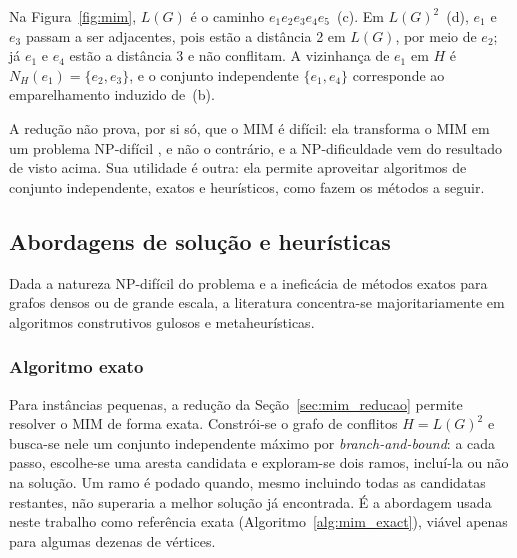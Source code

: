 Na Figura~\ref{fig:mim}, $L(G)$ é o caminho $e_1 e_2 e_3 e_4 e_5$~(c). Em $L(G)^2$~(d), $e_1$ e $e_3$ passam a ser adjacentes, pois estão a distância 2 em $L(G)$, por meio de $e_2$; já $e_1$ e $e_4$ estão a distância 3 e não conflitam. A vizinhança de $e_1$ em $H$ é $N_H(e_1) = \{e_2, e_3\}$, e o conjunto independente $\{e_1, e_4\}$ corresponde ao emparelhamento induzido de~(b).

A redução não prova, por si só, que o MIM é difícil: ela transforma o MIM em um problema NP-difícil \cite{garey-jhonson}, e não o contrário, e a NP-dificuldade vem do resultado de  visto acima. Sua utilidade é outra: ela permite aproveitar algoritmos de conjunto independente, exatos e heurísticos, como fazem os métodos a seguir.

\subsection{Abordagens de solução e heurísticas}

Dada a natureza NP-difícil do problema e a ineficácia de métodos exatos para grafos densos ou de grande escala, a literatura concentra-se majoritariamente em algoritmos construtivos gulosos e metaheurísticas.

\subsubsection{Algoritmo exato}

Para instâncias pequenas, a redução da Seção~\ref{sec:mim_reducao} permite resolver o MIM de forma exata. Constrói-se o grafo de conflitos $H = L(G)^2$ e busca-se nele um conjunto independente máximo por \textit{branch-and-bound}: a cada passo, escolhe-se uma aresta candidata e exploram-se dois ramos, incluí-la ou não na solução. Um ramo é podado quando, mesmo incluindo todas as candidatas restantes, não superaria a melhor solução já encontrada. É a abordagem usada neste trabalho como referência exata (Algoritmo~\ref{alg:mim_exact}), viável apenas para algumas dezenas de vértices.

